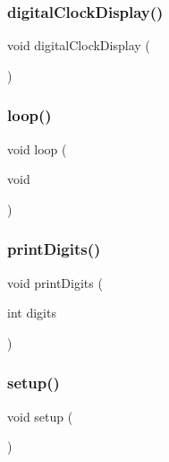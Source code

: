 \subsubsection{\texorpdfstring{digital\+Clock\+Display()}{digitalClockDisplay()}}
{\footnotesize\ttfamily void digital\+Clock\+Display (\begin{DoxyParamCaption}{ }\end{DoxyParamCaption})}

\mbox{\label{_time_g_p_s_8ino_afe461d27b9c48d5921c00d521181f12f}} 
\subsubsection{\texorpdfstring{loop()}{loop()}}
{\footnotesize\ttfamily void loop (\begin{DoxyParamCaption}\item[{void}]{ }\end{DoxyParamCaption})}

\mbox{\label{_time_g_p_s_8ino_a772afab0396032477ec7b01d14c774b2}} 
\subsubsection{\texorpdfstring{print\+Digits()}{printDigits()}}
{\footnotesize\ttfamily void print\+Digits (\begin{DoxyParamCaption}\item[{int}]{digits }\end{DoxyParamCaption})}

\mbox{\label{_time_g_p_s_8ino_a4fc01d736fe50cf5b977f755b675f11d}} 
\subsubsection{\texorpdfstring{setup()}{setup()}}
{\footnotesize\ttfamily void setup (\begin{DoxyParamCaption}{ }\end{DoxyParamCaption})}



